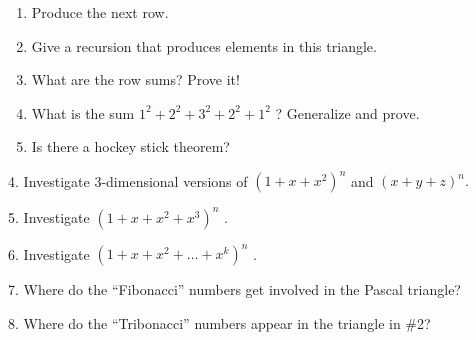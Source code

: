 \documentclass[10pt,]{book}
\theoremstyle{plain}
\theoremstyle{definition}
\theoremstyle{definition}
\theoremstyle{definition}
\numberwithin{equation}{chapter}
\begin{document}
\begin{exerciselist}
\begin{enumerate}[label=(\alph*)]
\item\hypertarget{li-95}{}\hypertarget{p-1700}{}%
Produce the next row.%
\item\hypertarget{li-96}{}\hypertarget{p-1701}{}%
Give a recursion that produces elements in this triangle.%
\item\hypertarget{li-97}{}\hypertarget{p-1702}{}%
What are the row sums? Prove it!%
\item\hypertarget{li-98}{}\hypertarget{p-1703}{}%
What is the sum \(1^{2} + 2^{2} + 3^{2} + 2^{2} + 1^{2}\) ? Generalize and prove.%
\item\hypertarget{li-99}{}\hypertarget{p-1704}{}%
Is there a hockey stick theorem?%
\end{enumerate}
%
\par\smallskip
\item[4.]\hypertarget{exercise-30}{}\hypertarget{p-1705}{}%
Investigate 3-dimensional versions of \(\left( 1 + x + x^{2} \right)^{n}\) and \(\left( x + y + z \right)^{n}.\)%
\par\smallskip
\item[5.]\hypertarget{exercise-31}{}\hypertarget{p-1706}{}%
Investigate \(\left( 1 + x + x^{2} + x^{3} \right)^{n}\) .%
\par\smallskip
\item[6.]\hypertarget{exercise-32}{}\hypertarget{p-1707}{}%
Investigate \(\left( 1 + x + x^{2} + \ldots + x^{k} \right)^{n}\) .%
\par\smallskip
\item[7.]\hypertarget{exercise-33}{}\hypertarget{p-1708}{}%
Where do the ``Fibonacci'' numbers get involved in the Pascal triangle?%
\par\smallskip
\item[8.]\hypertarget{exercise-34}{}\hypertarget{p-1709}{}%
Where do the ``Tribonacci'' numbers appear in the triangle in \#2?%
\par\smallskip
\end{exerciselist}
\typeout{************************************************}
\typeout{************************************************}
\end{document}
